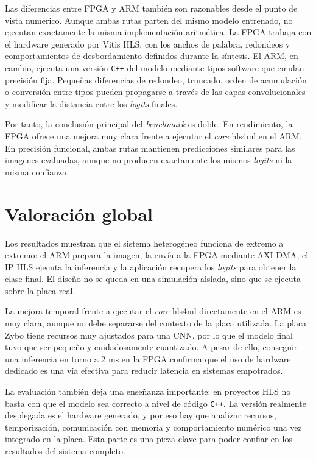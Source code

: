 Las diferencias entre \ac{FPGA} y \ac{ARM} también son razonables desde el punto de vista
numérico. Aunque
ambas rutas parten del mismo modelo entrenado, no ejecutan exactamente la misma implementación
aritmética. La \ac{FPGA} trabaja con el hardware generado por Vitis \ac{HLS}, con los
anchos de palabra,
redondeos y comportamientos de desbordamiento definidos durante la síntesis. El \ac{ARM}, en cambio,
ejecuta una versión \texttt{C++} del modelo mediante tipos software que emulan precisión
fija. Pequeñas
diferencias de redondeo, truncado, orden de acumulación o conversión entre tipos pueden propagarse
a través de las capas convolucionales y modificar la distancia entre los \textit{logits} finales.

Por tanto, la conclusión principal del \textit{benchmark} es doble. En rendimiento, la
\ac{FPGA} ofrece una
mejora muy clara frente a ejecutar el \textit{core} hls4ml en el \ac{ARM}. En precisión
funcional, ambas rutas
mantienen predicciones similares para las imagenes evaluadas, aunque no producen exactamente los
mismos \textit{logits} ni la misma confianza.

\section{Valoración global}

Los resultados muestran que el sistema heterogéneo funciona de extremo a extremo: el
\ac{ARM} prepara
la imagen, la envía a la \ac{FPGA} mediante \ac{AXI} \ac{DMA}, el \ac{IP} \ac{HLS}
ejecuta la inferencia y la aplicación
recupera los \textit{logits} para obtener la clase final. El diseño no se queda en una
simulación aislada,
sino que se ejecuta sobre la placa real.

La mejora temporal frente a ejecutar el \textit{core} hls4ml directamente en el \ac{ARM}
es muy clara, aunque no
debe separarse del contexto de la placa utilizada. La placa Zybo tiene recursos muy ajustados para
una \ac{CNN}, por lo que el modelo final tuvo que ser pequeño y cuidadosamente
cuantizado. A pesar de
ello, conseguir una inferencia en torno a 2 ms en la \ac{FPGA} confirma que el uso de
hardware dedicado
es una vía efectiva para reducir latencia en sistemas empotrados.

La evaluación también deja una enseñanza importante: en proyectos \ac{HLS} no basta con
que el modelo
sea correcto a nivel de código \texttt{C++}. La versión realmente desplegada es el
hardware generado, y por
eso hay que analizar recursos, temporización, comunicación con memoria y comportamiento numérico
una vez integrado en la placa. Esta parte es una pieza clave para poder confiar en los resultados
del sistema completo.
